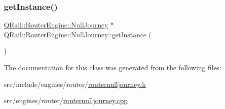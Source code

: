 \subsubsection{\texorpdfstring{getInstance()}{getInstance()}}
{\footnotesize\ttfamily \mbox{\hyperlink{classQRail_1_1RouterEngine_1_1NullJourney}{Q\+Rail\+::\+Router\+Engine\+::\+Null\+Journey}} $\ast$ Q\+Rail\+::\+Router\+Engine\+::\+Null\+Journey\+::get\+Instance (\begin{DoxyParamCaption}{ }\end{DoxyParamCaption})\hspace{0.3cm}{\ttfamily [static]}}



The documentation for this class was generated from the following files\+:\begin{DoxyCompactItemize}
\item 
src/include/engines/router/\mbox{\hyperlink{routernulljourney_8h}{routernulljourney.\+h}}\item 
src/engines/router/\mbox{\hyperlink{routernulljourney_8cpp}{routernulljourney.\+cpp}}\end{DoxyCompactItemize}
